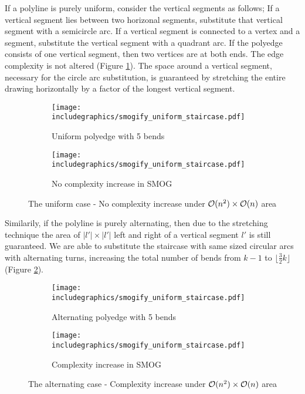 \begin{sketch}
	If a polyline is purely uniform, consider the vertical segments as follows; If a vertical segment lies between two horizonal segments, substitute that vertical segment with a semicircle arc. If a vertical segment is connected to a vertex and a segment, substitute the vertical segment with a quadrant arc. If the polyedge consists of one vertical segment, then two vertices are at both ends. The edge complexity is not altered (Figure \ref{im:4-uniform}). The space around a vertical segment, necessary for the circle arc substitution, is guaranteed by stretching the entire drawing horizontally by a factor of the longest vertical segment.\\
\begin{figure}[H]
\centering
\begin{subfigure}{0.4\linewidth}
	\centering
	\texttt{[image: includegraphics/smogify\_uniform\_staircase.pdf]}
	\caption{Uniform polyedge with 5 bends}
\end{subfigure}
\begin{subfigure}{0.4\linewidth}
	\centering
	\texttt{[image: includegraphics/smogify\_uniform\_staircase.pdf]}
	\caption{No complexity increase in SMOG}
\end{subfigure}
\caption{The uniform case - No complexity increase under $\mathcal{O}(n^2)\times\mathcal{O}(n)$ area}\label{im:4-uniform}
\end{figure}
Similarily, if the polyline is purely alternating, then due to the stretching technique the area of $|l'|\times |l'|$ left and right of a vertical segment $l'$ is still guaranteed. We are able to substitute the staircase with same sized circular arcs with alternating turns, increasing the total number of bends from $k-1$ to $\lfloor\frac{3}{2}k\rfloor$ (Figure \ref{im:4-alter}).\\
\begin{figure}[H]
\centering
\begin{subfigure}{0.45\linewidth}
	\centering
	\texttt{[image: includegraphics/smogify\_uniform\_staircase.pdf]}
	\caption{Alternating polyedge with 5 bends}
\end{subfigure}
\begin{subfigure}{0.4\linewidth}
	\centering
	\texttt{[image: includegraphics/smogify\_uniform\_staircase.pdf]}
	\caption{Complexity increase in SMOG}
\end{subfigure}
\caption{The alternating case - Complexity increase under $\mathcal{O}(n^2)\times\mathcal{O}(n)$ area}\label{im:4-alter}
\end{figure}
\end{sketch}

